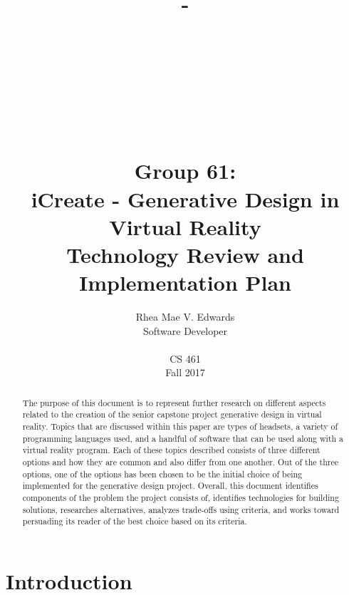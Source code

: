 \documentclass[letterpaper,10pt,onecolumn,compsoc]{IEEEtran}
\title{-\\ ~ \\ ~ \\ ~ \\ ~ \\ ~ \\Group 61:\\iCreate - Generative Design in Virtual Reality\\ Technology Review and Implementation Plan}
\author{Rhea Mae V. Edwards\\Software Developer\\ ~ \\CS 461\\Fall 2017}
\begin{document}
\maketitle

\begin{abstract}


\noindent
The purpose of this document is to represent further research on different aspects related to the creation of the senior capstone project generative design in virtual reality. Topics that are discussed within this paper are types of headsets, a variety of programming languages used, and a handful of software that can be used along with a virtual reality program. Each of these topics described consists of three different options and how they are common and also differ from one another. Out of the three options, one of the options has been chosen to be the initial choice of being implemented for the generative design project. Overall, this document identifies components of the problem the project consists of, identifies technologies for building solutions, researches alternatives, analyzes trade-offs using criteria, and works toward persuading its reader of the best choice based on its criteria.

\end{abstract}

\newpage


\tableofcontents

\newpage

\section{Introduction}
\end{document}
